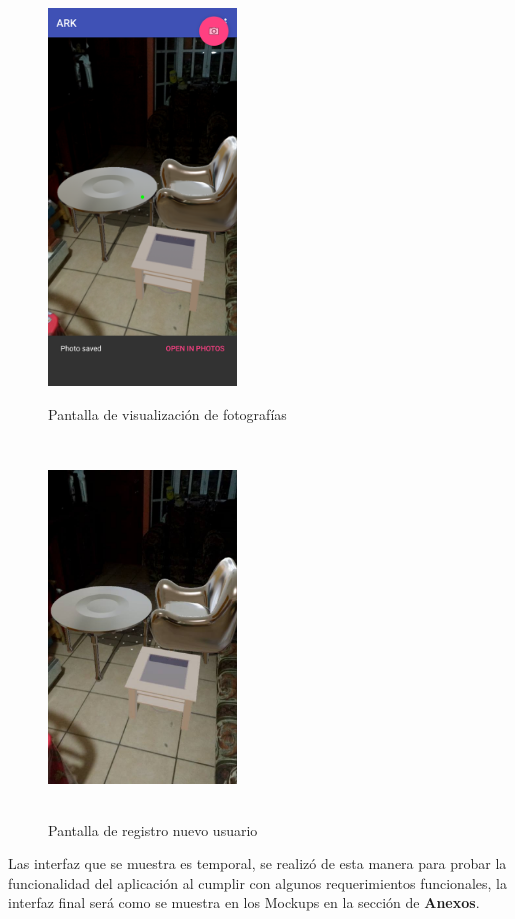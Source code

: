 \begin{figure}[H]
	\begin{minipage}{0.48\textwidth}
		\centering
		\includegraphics[width=5cm,height=10cm]{imagenes/iteraciones/save1.png}
		\caption{Pantalla de visualización de fotografías}
		\label{fig:save}
	\end{minipage}\hfill
	\begin{minipage}{0.48\textwidth}
		\centering
		\includegraphics[width=5cm,height=10cm]{imagenes/iteraciones/foto.jpg}
		\caption{Pantalla de registro nuevo usuario}
		\label{fig:foto}
	\end{minipage}\hfill
\end{figure}
Las interfaz que se muestra es temporal, se realizó de esta manera para probar la funcionalidad del aplicación al cumplir con algunos requerimientos funcionales, la interfaz final será como se muestra en los Mockups en la sección de \textbf{Anexos}.

